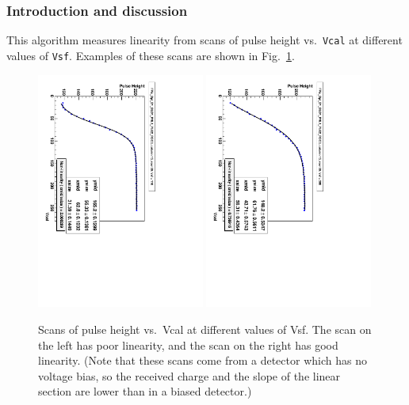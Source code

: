 \subsubsection{Introduction and discussion}

This algorithm measures linearity from scans of pulse height vs.~\verb|Vcal| at different values of \verb|Vsf|.  Examples of these scans are shown in Fig.~\ref{fig:PH_vs_Vcal_scans}.

\begin{figure}
\begin{center}
 \includegraphics[angle=90,width=0.49\textwidth]{PH_vs_Vcal_poorLinearity.pdf}
 \includegraphics[angle=90,width=0.49\textwidth]{PH_vs_Vcal_goodLinearity.pdf}
\end{center}
\caption{Scans of pulse height vs.~Vcal at different values of Vsf.  The scan on the left has poor linearity, and the scan on the right has good linearity.  (Note that these scans come from a detector which has no voltage bias, so the received charge and the slope of the linear section are lower than in a biased detector.)}
\label{fig:PH_vs_Vcal_scans}
\end{figure}

